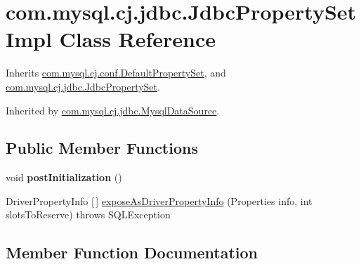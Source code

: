 \hypertarget{classcom_1_1mysql_1_1cj_1_1jdbc_1_1_jdbc_property_set_impl}{}\section{com.\+mysql.\+cj.\+jdbc.\+Jdbc\+Property\+Set\+Impl Class Reference}
\label{classcom_1_1mysql_1_1cj_1_1jdbc_1_1_jdbc_property_set_impl}


Inherits \mbox{\hyperlink{classcom_1_1mysql_1_1cj_1_1conf_1_1_default_property_set}{com.\+mysql.\+cj.\+conf.\+Default\+Property\+Set}}, and \mbox{\hyperlink{interfacecom_1_1mysql_1_1cj_1_1jdbc_1_1_jdbc_property_set}{com.\+mysql.\+cj.\+jdbc.\+Jdbc\+Property\+Set}}.



Inherited by \mbox{\hyperlink{classcom_1_1mysql_1_1cj_1_1jdbc_1_1_mysql_data_source}{com.\+mysql.\+cj.\+jdbc.\+Mysql\+Data\+Source}}.

\subsection*{Public Member Functions}
\begin{DoxyCompactItemize}
\item 
\mbox{\label{classcom_1_1mysql_1_1cj_1_1jdbc_1_1_jdbc_property_set_impl_a2a59c7314cac752f363503d96a4b45fc}} 
void {\bfseries post\+Initialization} ()
\item 
Driver\+Property\+Info \mbox{[}$\,$\mbox{]} \mbox{\hyperlink{classcom_1_1mysql_1_1cj_1_1jdbc_1_1_jdbc_property_set_impl_a0bcb782acac24d633f1c6b5108102dcd}{expose\+As\+Driver\+Property\+Info}} (Properties info, int slots\+To\+Reserve)  throws S\+Q\+L\+Exception 
\end{DoxyCompactItemize}


\subsection{Member Function Documentation}
\mbox{\label{classcom_1_1mysql_1_1cj_1_1jdbc_1_1_jdbc_property_set_impl_a0bcb782acac24d633f1c6b5108102dcd}} 

